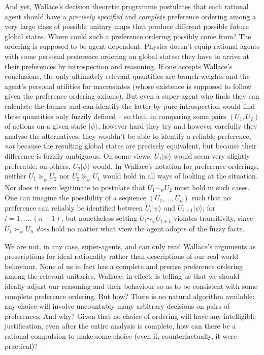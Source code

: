 \documentclass[aps,
pra,epsfig]{revtex4}
\def\ket#1{| #1\rangle}
\begin{document}
And yet, Wallace's decision theoretic programme postulates
that each rational agent should have a {\it precisely specified} 
and {\it complete}
preference ordering among a very large class of
possible unitary maps that produce different possible 
future global states.  Where could such
a preference ordering possibly come from?  
The ordering is supposed to be agent-dependent.  Physics doesn't equip rational
agents with some personal preference ordering on global states: they
have to arrive at their preferences by introspection and reasoning.
If one accepts Wallace's conclusions, the only ultimately relevant
quantities are branch weights and the agent's personal utilities for 
macrostates (whose existence is supposed to follow given the preference
ordering axioms).
But even a super-agent who finds they can calculate the former and can
identify the latter by pure introspection would find these quantities 
only fuzzily defined -- so that, in comparing
some pairs $( U_1 , U_2 )$ of actions on a given state $\ket{ \psi }$, 
however hard they try and however carefully they analyse the alternatives, 
they wouldn't be able to identify a reliable preference, {\it not}
because the resulting global states are precisely equivalent, but 
because their difference is fuzzily ambiguous.
On some views, $U_1 \ket{ \psi }$ would seem very slightly preferable;
on others, $U_2 \ket{ \psi }$ would.  
In Wallace's notation \cite{wallacevolone} for preference orderings, 
neither $U_1 \succeq_{\psi} U_2$ nor $U_2 \succeq_{\psi} U_1$ would hold in all
ways of looking at the situation.  
Nor does it seem legitimate to postulate that $ U_1 \sim_{\psi} U_2 $ 
must hold in such cases.  One can imagine the possibility
of a sequence $( U_1 , \ldots , U_n )$ such that no 
preference can reliably be identified
between $U_i \ket {\psi }$ and $U_{i+1} \ket{\psi}$, for $i=1 , \ldots, (n-1)$,
but nonetheless setting $U_i \sim_{\psi} U_{i+1}$ violates transitivity,
since $U_1  \succ_{\psi} U_n $ {\it does} hold no matter what 
view the agent adopts of the fuzzy facts.   

We are not, in any case, super-agents, and
can only read Wallace's arguments as prescriptions
for ideal rationality rather than descriptions of our real-world behaviour.
None of us in fact has a complete and precise preference 
ordering among the relevant unitaries.   Wallace, in effect,
is telling us that we should ideally adjust our
reasoning and their behaviour so as to be consistent with 
some complete preference ordering.   But how?  There is no 
natural algorithm available: any choice will involve uncountably
many arbitrary decisions on pairs of preferences.\cite{savageworry}   
And why?  Given that no 
choice of ordering will have any intelligible justification, 
even after the entire analysis is complete, how can there 
be a rational compulsion to make some choice (even if, 
counterfactually, it were practical)?
\end{document}
